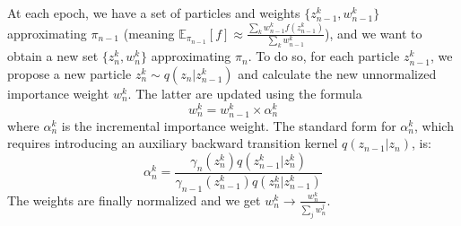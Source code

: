 \documentclass[11pt,a4paper]{article}
\begin{document}
		At each epoch, we have a set of particles and weights $\{z_{n-1}^k, w_{n-1}^k\}$ approximating $\pi_{n-1}$ (meaning $\mathbb{E}_{\pi_{n-1}}[f] \approx \frac{\sum_k w_{n-1}^k f(z_{n-1}^k)}{\sum_k w_{n-1}^k}$), and we want to obtain a new set $\{z_n^k, w_n^k\}$ approximating $\pi_n$. To do so, for each particle $z^k_{n-1}$, we propose a new particle $z_n^k \sim q(z_n | z_{n-1}^k)$ and calculate the new unnormalized importance weight $w_n^k$. The latter are updated using the formula 
		\begin{equation}
			w_n^k = w_{n-1}^k \times \alpha_{n}^k
		\end{equation}
		where $\alpha_n^k$ is the incremental importance weight. The standard form for $\alpha_n^k$, which requires introducing an auxiliary backward transition kernel $q(z_{n-1} | z_n)$, is:
		\begin{equation}
			\alpha_n^k = \frac{ \gamma_n(z_n^k) q(z_{n-1}^k | z_n^k) }{ \gamma_{n-1}(z_{n-1}^k) q(z_n^k | z_{n-1}^k) } 
		\end{equation}
		The weights are finally normalized and we get $w_n^k \rightarrow \frac{w_n^k}{\sum_j w_n^j}$.
		
\end{document}
